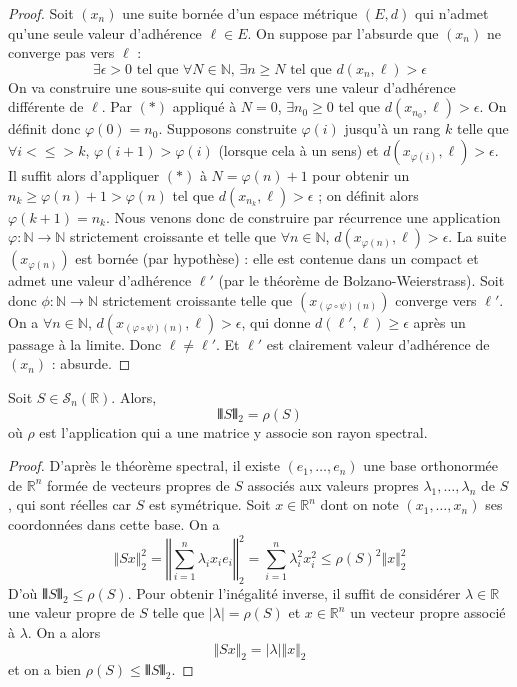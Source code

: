 	\begin{proof}
		Soit $(x_n)$ une suite bornée d'un espace métrique $(E, d)$ qui n'admet qu'une seule valeur d'adhérence $\ell \in E$. On suppose par l'absurde que $(x_n)$ ne converge pas vers $\ell$ :
		\[ \exists \epsilon > 0 \text{ tel que } \forall N \in \mathbb{N}, \, \exists n \geq N \text{ tel que } d(x_n, \ell) > \epsilon \tag{$*$} \]
		On va construire une sous-suite qui converge vers une valeur d'adhérence différente de $\ell$.
		\newpar
		Par $(*)$ appliqué à $N = 0$, $\exists n_0 \geq 0$ tel que $d(x_{n_0}, \ell) > \epsilon$. On définit donc $\varphi(0) = n_0$.
		\newpar
		Supposons construite $\varphi(i)$ jusqu'à un rang $k$ telle que $\forall i <\leq> k$, $\varphi(i+1) > \varphi(i)$ (lorsque cela à un sens) et $d(x_{\varphi(i)}, \ell) > \epsilon$. Il suffit alors d'appliquer $(*)$ à $N = \varphi(n) + 1$ pour obtenir un $n_k \geq \varphi(n) + 1 > \varphi(n)$ tel que $d(x_{n_k}, \ell) > \epsilon$ ; on définit alors $\varphi(k+1) = n_k$.
		\newpar
		Nous venons donc de construire par récurrence une application $\varphi : \mathbb{N} \rightarrow \mathbb{N}$ strictement croissante et telle que $\forall n \in \mathbb{N}$, $d(x_{\varphi(n)}, \ell) > \epsilon$. La suite $(x_{\varphi(n)})$ est bornée (par hypothèse) : elle est contenue dans un compact et admet une valeur d'adhérence $\ell'$ (par le théorème de Bolzano-Weierstrass). Soit donc $\phi : \mathbb{N} \rightarrow \mathbb{N}$ strictement croissante telle que $(x_{(\varphi \circ \psi)(n)})$ converge vers $\ell'$.
		\newpar
		On a $\forall n \in \mathbb{N}$, $d(x_{(\varphi \circ \psi)(n)}, \ell) > \epsilon$, qui donne $d(\ell', \ell) \geq \epsilon$ après un passage à la limite. Donc $\ell \neq \ell'$.	Et $\ell'$ est clairement valeur d'adhérence de $(x_n)$ : absurde.
	\end{proof}


	\begin{lemma}
		\label{homeomorphisme-de-l-exponentielle-3}
		Soit $S \in \mathcal{S}_n(\mathbb{R})$. Alors,
		\[ \VERT S \VERT_2 = \rho(S) \]
		où $\rho$ est l'application qui a une matrice y associe son rayon spectral.
	\end{lemma}

	\begin{proof}
		D'après le théorème spectral, il existe $(e_1, \dots, e_n)$ une base orthonormée de $\mathbb{R}^n$ formée de vecteurs propres de $S$ associés aux valeurs propres $\lambda_1, \dots, \lambda_n$ de $S$, qui sont réelles car $S$ est symétrique. Soit $x \in \mathbb{R}^n$ dont on note $(x_1, \dots, x_n)$ ses coordonnées dans cette base. On a
		\[ \Vert Sx \Vert_2^2 = \left \Vert \sum_{i=1}^{n} \lambda_i x_i e_i \right \Vert_2^2 = \sum_{i=1}^n \lambda_i^2 x_i^2 \leq \rho(S)^2 \Vert x \Vert_2^2 \]
		D'où $\VERT S \VERT_2 \leq \rho(S)$. Pour obtenir l'inégalité inverse, il suffit de considérer $\lambda \in \mathbb{R}$ une valeur propre de $S$ telle que $|\lambda| = \rho(S)$ et $x \in \mathbb{R}^n$ un vecteur propre associé à $\lambda$. On a alors
		\[ \Vert Sx \Vert_2 = |\lambda| \Vert x \Vert_2 \]
		et on a bien $\rho(S) \leq \VERT S \VERT_2$.
	\end{proof}

